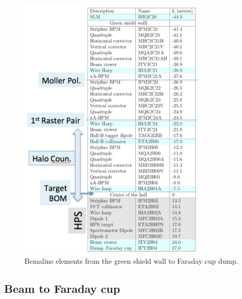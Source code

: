 \begin{figure}[htb!]
\centering
\includegraphics[width=0.8\textwidth]{beamline_elements.pdf}
\caption{Bemaline elements from the green shield wall to Faraday cup dump.}
\label{fig:belements}
\end{figure}

\clearpage
\subsection{Beam to Faraday cup}
\indent

